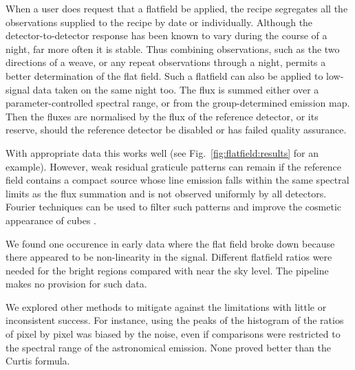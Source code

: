 \documentclass[final,authoryear,5p,times,twocolumn]{elsarticle}
\begin{document}
When a user does request that a flatfield be applied, the recipe
segregates all the observations supplied to the recipe by date or
individually.  Although the detector-to-detector response has been
known to vary during the course of a night, far more often it is
stable.  Thus combining observations, such as the two directions of a
weave, or any repeat observations through a night, permits a better
determination of the flat field.  Such a flatfield can also be applied
to low-signal data taken on the same night too.  The flux is summed
either over a parameter-controlled spectral range, or from the
group-determined emission map.  Then the fluxes are normalised by the
flux of the reference detector, or its reserve, should the reference
detector be disabled or has failed quality assurance.

With appropriate data this works well (see
Fig.~\ref{fig:flatfield:results} for an example).  However, weak
residual graticule patterns can remain if the reference field contains
a compact source whose line emission falls within the same spectral
limits as the flux summation and is not observed uniformly by all
detectors.  Fourier techniques can be used to filter such patterns and
improve the cosmetic appearance of cubes \citep{2015WHITE_OPH}.

We found one occurence in early data where the flat field broke down
because there appeared to be non-linearity in the signal.  Different
flatfield ratios were needed for the bright regions compared with near
the sky level.  The pipeline makes no provision for such data.

We explored other methods to mitigate against the limitations with
little or inconsistent success.  For instance, using the peaks of the
histogram of the ratios of pixel by pixel was biased by the noise,
even if comparisons were restricted to the spectral range of the
astronomical emission.  None proved better than the Curtis formula.
\end{document}
